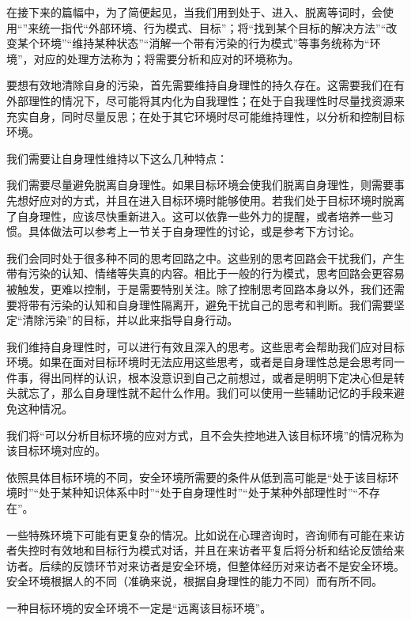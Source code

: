 在接下来的篇幅中，为了简便起见，当我们用到处于、进入、脱离等词时，会使用“”来统一指代“外部环境、行为模式、目标”；将“找到某个目标的解决方法”“改变某个环境”“维持某种状态”“消解一个带有污染的行为模式”等事务统称为“环境”，对应的处理方法称为；将需要分析和应对的环境称为。

要想有效地清除自身的污染，首先需要维持自身理性的持久存在。这需要我们在有外部理性的情况下，尽可能将其内化为自我理性；在处于自我理性时尽量找资源来充实自身，同时尽量反思；在处于其它环境时尽可能维持理性，以分析和控制目标环境。
\begin{explain}
我们需要让自身理性维持以下这么几种特点：

我们需要尽量避免脱离自身理性。如果目标环境会使我们脱离自身理性，则需要事先想好应对的方式，并且在进入目标环境时能够使用。若我们处于目标环境时脱离了自身理性，应该尽快重新进入。这可以依靠一些外力的提醒，或者培养一些习惯。具体做法可以参考上一节关于自身理性的讨论，或是参考下方讨论。

我们会同时处于很多种不同的思考回路之中。这些别的思考回路会干扰我们，产生带有污染的认知、情绪等失真的内容。相比于一般的行为模式，思考回路会更容易被触发，更难以控制，于是需要特别关注。除了控制思考回路本身以外，我们还需要将带有污染的认知和自身理性隔离开，避免干扰自己的思考和判断。我们需要坚定“清除污染”的目标，并以此来指导自身行动。

我们维持自身理性时，可以进行有效且深入的思考。这些思考会帮助我们应对目标环境。如果在面对目标环境时无法应用这些思考，或者是自身理性总是会思考同一件事，得出同样的认识，根本没意识到自己之前想过，或者是明明下定决心但是转头就忘了，那么自身理性就不起什么作用。我们可以使用一些辅助记忆的手段来避免这种情况。
\end{explain}
我们将“可以分析目标环境的应对方式，且不会失控地进入该目标环境”的情况称为该目标环境对应的。
\begin{examples}
依照具体目标环境的不同，安全环境所需要的条件从低到高可能是“处于该目标环境时”“处于某种知识体系中时”“处于自身理性时”“处于某种外部理性时”“不存在”。

一些特殊环境下可能有更复杂的情况。比如说在心理咨询时，咨询师有可能在来访者失控时有效地和目标行为模式对话，并且在来访者平复后将分析和结论反馈给来访者。后续的反馈环节对来访者是安全环境，但整体经历对来访者不是安全环境。安全环境根据人的不同（准确来说，根据自身理性的能力不同）而有所不同。
\end{examples}
一种目标环境的安全环境不一定是“远离该目标环境”。

